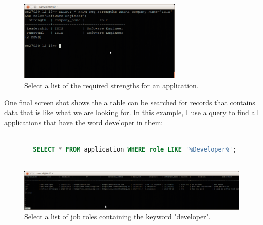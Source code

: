 \documentclass{article}
\begin{document}
\begin{figure}[H]
\centering
\includegraphics[width=0.7\textwidth]{img/test/test-req-strengths.png}
\caption{Select a list of the required strengths for an application.}
\label{fig:test-req-strengths}
\end{figure}

One final screen shot shows the a table can be searched for records that contains data that is like what we are looking for. In this example, I use a query to find all applications that have the word developer in them:

\begin{center}
	\begin{lstlisting}[language=sql, showstringspaces=false]

		SELECT * FROM application WHERE role LIKE '%Developer%';
		
	\end{lstlisting}
\end{center}

\begin{figure}[H]
\centering
\includegraphics[width=1\textwidth]{img/test/test-like.png}
\caption{Select a list of job roles containing the keyword "developer".}
\label{fig:test-like}
\end{figure}
\end{document}
